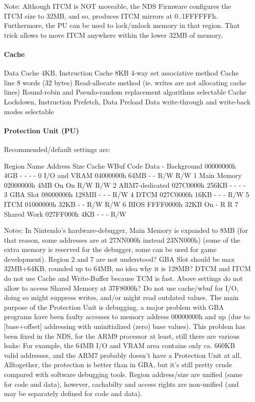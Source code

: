 \documentclass[11pt,a4paper]{proc}
\begin{document}
\begin{flushleft}
Note: Although ITCM is NOT moveable, the NDS Firmware configures the ITCM size to 32MB, and so, produces ITCM mirrors at 0..1FFFFFFh. Furthermore, the PU can be used to lock/unlock memory in that region. That trick allows to move ITCM anywhere within the lower 32MB of memory.

\paragraph{Cache}
  Data Cache 4KB, Instruction Cache 8KB
  4-way set associative method
  Cache line 8 words (32 bytes)
  Read-allocate method (ie. writes are not allocating cache lines)
  Round-robin and Pseudo-random replacement algorithms selectable
  Cache Lockdown, Instruction Prefetch, Data Preload
  Data write-through and write-back modes selectable


\paragraph{Protection Unit (PU)}
Recommended/default settings are:

  Region  Name            Address   Size   Cache WBuf Code Data
  -       Background      00000000h 4GB    -     -    -    -
  0       I/O and VRAM    04000000h 64MB   -     -    R/W  R/W
  1       Main Memory     02000000h 4MB    On    On   R/W  R/W
  2       ARM7-dedicated  027C0000h 256KB  -     -    -    -
  3       GBA Slot        08000000h 128MB  -     -    -    R/W
  4       DTCM            027C0000h 16KB   -     -    -    R/W
  5       ITCM            01000000h 32KB   -     -    R/W  R/W
  6       BIOS            FFFF0000h 32KB   On    -    R    R
  7       Shared Work     027FF000h 4KB    -     -    -    R/W

Notes: In Nintendo's hardware-debugger, Main Memory is expanded to 8MB (for that reason, some addresses are at 27NN000h instead 23NN000h) (some of the extra memory is reserved for the debugger, some can be used for game development). Region 2 and 7 are not understood? GBA Slot should be max 32MB+64KB, rounded up to 64MB, no idea why it is 128MB? DTCM and ITCM do not use Cache and Write-Buffer because TCM is fast. Above settings do not allow to access Shared Memory at 37F8000h? Do not use cache/wbuf for I/O, doing so might suppress writes, and/or might read outdated values.
The main purpose of the Protection Unit is debugging, a major problem with GBA programs have been faulty accesses to memory address 00000000h and up (due to [base+offset] addressing with uninitialized (zero) base values). This problem has been fixed in the NDS, for the ARM9 processor at least, still there are various leaks: For example, the 64MB I/O and VRAM area contains only ca. 660KB valid addresses, and the ARM7 probably doesn't have a Protection Unit at all. Alltogether, the protection is better than in GBA, but it's still pretty crude compared with software debugging tools.
Region address/size are unified (same for code and data), however, cachabilty and access rights are non-unified (and may be separately defined for code and data).


\end{flushleft}
\end{document}
